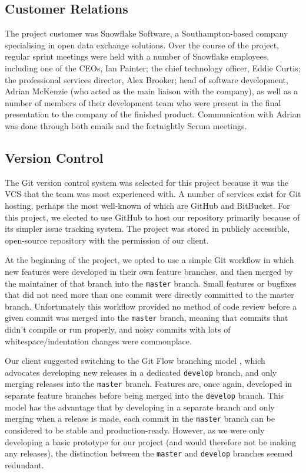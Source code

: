 \documentclass[a4paper, 12pt, twoside]{article}
\begin{document}
\subsection{Customer Relations}
\label{sec:plan_customer_relations}

The project customer was Snowflake Software, a Southampton-based company specialising in open data exchange solutions. Over the course of the project, regular sprint meetings were held with a number of Snowflake employees, including one of the CEOs, Ian Painter; the chief technology officer, Eddie Curtis; the professional services director, Alex Brooker; head of software development, Adrian McKenzie (who acted as the main liaison with the company), as well as a number of members of their development team who were present in the final presentation to the company of the finished product. Communication with Adrian was done through both emails and the fortnightly Scrum meetings.

\subsection{Version Control}
\label{sec:version_control}

The Git version control system was selected for this project because it was the VCS that the team was most experienced with. A number of services exist for Git hosting, perhaps the most well-known of which are GitHub and BitBucket. For this project, we elected to use GitHub to host our repository primarily because of its simpler issue tracking system. The project was stored in publicly accessible, open-source repository with the permission of our client.

At the beginning of the project, we opted to use a simple Git workflow in which new features were developed in their own feature branches, and then merged by the maintainer of that branch into the \texttt{master} branch. Small features or bugfixes that did not need more than one commit were directly committed to the master branch. Unfortunately this workflow provided no method of code review before a given commit was merged into the \texttt{master} branch, meaning that commits that didn't compile or run properly, and noisy commits with lots of whitespace/indentation changes were commonplace.

Our client suggested switching to the Git Flow branching model \cite{Driessen2010}, which advocates developing new releases in a dedicated \texttt{develop} branch, and only merging releases into the \texttt{master} branch. Features are, once again, developed in separate feature branches before being merged into the \texttt{develop} branch. This model has the advantage that by developing in a separate branch and only merging when a release is made, each commit in the \texttt{master} branch can be considered to be stable and production-ready. However, as we were only developing a basic prototype for our project (and would therefore not be making any releases), the distinction between the \texttt{master} and \texttt{develop} branches seemed redundant.
\end{document}
